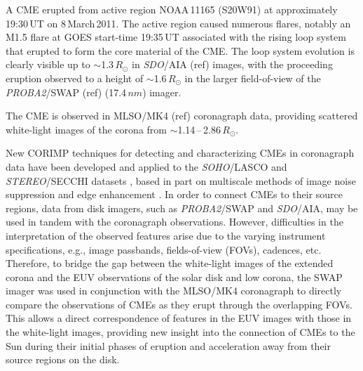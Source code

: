 \documentclass[preprint2]{aastex}
\begin{document}
A CME erupted from active region NOAA\,11165 (S20W91) at approximately 19:30\,UT on 8\,March\,2011. The active region caused numerous flares, notably an M1.5 flare at GOES start-time 19:35\,UT associated with the rising loop system that erupted to form the core material of the CME. The loop system evolution is clearly visible up to $\sim$1.3\,$R_{\odot}$ in \emph{SDO}/AIA (ref) images, with the proceeding eruption observed to a height of $\sim$1.6\,$R_{\odot}$ in the larger field-of-view of the \emph{PROBA2}/SWAP (ref) (17.4\,$nm$) imager.

The CME is observed in MLSO/MK4 (ref) coronagraph data, providing scattered white-light images of the corona from $\sim$1.14\,--\,2.86\,$R_{\odot}$.

New CORIMP techniques for detecting and characterizing CMEs in coronagraph data have been developed and applied to the \emph{SOHO}/LASCO and \emph{STEREO}/SECCHI datasets \citep{2012ApJ...752..144M, 2012ApJ...752..145B}, based in part on multiscale methods of image noise suppression and edge enhancement \citep{2009A&A...495..325B, 2008SoPh..248..457Y}. In order to connect CMEs to their source regions, data from disk imagers, such as \emph{PROBA2}/SWAP and \emph{SDO}/AIA, may be used in tandem with the coronagraph observations. However, difficulties in the interpretation of the observed features arise due to the varying instrument specifications, e.g., image passbands, fields-of-view (FOVs), cadences, etc. Therefore, to bridge the gap between the white-light images of the extended corona and the EUV observations of the solar disk and low corona, the SWAP imager was used in conjunction with the MLSO/MK4 coronagraph to directly compare the observations of CMEs as they erupt through the overlapping FOVs. This allows a direct correspondence of features in the EUV images with those in the white-light images, providing new insight into the connection of CMEs to the Sun during their initial phases of eruption and acceleration away from their source regions on the disk.

\end{document}
